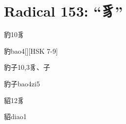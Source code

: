 
\section*{Radical 153: ``⾘''}

\begin{Entry}{豹}{10}{⾘}
  \begin{Phonetics}{豹}{bao4}[][HSK 7-9]
  \end{Phonetics}
\end{Entry}

\begin{Entry}{豹子}{10,3}{⾘、⼦}
  \begin{Phonetics}{豹子}{bao4zi5}
  \end{Phonetics}
\end{Entry}

\begin{Entry}{貂}{12}{⾘}
  \begin{Phonetics}{貂}{diao1}
  \end{Phonetics}
\end{Entry}


